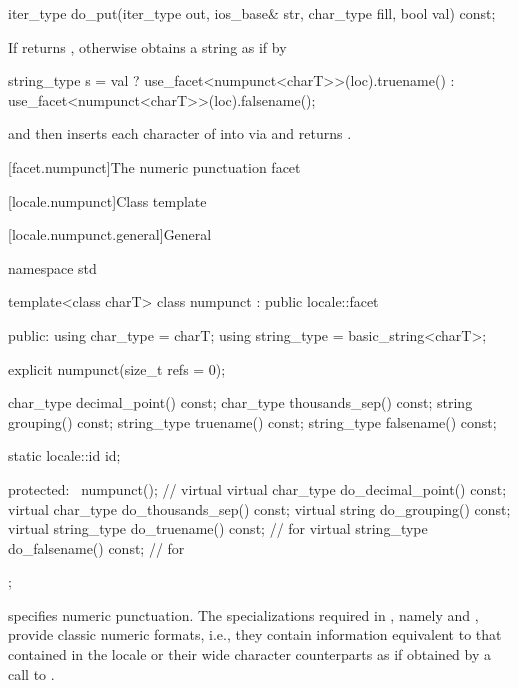 %
\begin{itemdecl}
iter_type do_put(iter_type out, ios_base& str, char_type fill, bool val) const;
\end{itemdecl}

\begin{itemdescr}
\pnum
\returns
If 
returns ,
otherwise obtains a string  as if by
\begin{codeblock}
string_type s =
  val ? use_facet<numpunct<charT>>(loc).truename()
      : use_facet<numpunct<charT>>(loc).falsename();
\end{codeblock}
and then inserts each character  of  into 
via 
and returns .
\end{itemdescr}

[facet.numpunct]{The numeric punctuation facet}

[locale.numpunct]{Class template }

[locale.numpunct.general]{General}

%
\begin{codeblock}
namespace std {
  template<class charT>
    class numpunct : public locale::facet {
    public:
      using char_type   = charT;
      using string_type = basic_string<charT>;

      explicit numpunct(size_t refs = 0);

      char_type    decimal_point()   const;
      char_type    thousands_sep()   const;
      string       grouping()        const;
      string_type  truename()        const;
      string_type  falsename()       const;

      static locale::id id;

    protected:
      ~numpunct();                                              // virtual
      virtual char_type    do_decimal_point() const;
      virtual char_type    do_thousands_sep() const;
      virtual string       do_grouping()      const;
      virtual string_type  do_truename()      const;            // for 
      virtual string_type  do_falsename()     const;            // for 
    };
}
\end{codeblock}

\pnum
{} specifies numeric punctuation.
The specializations
required in ,
namely  and ,
provide classic  numeric formats,
i.e., they contain information
equivalent to that contained in the  locale or
their wide character counterparts as if obtained by a call to .

